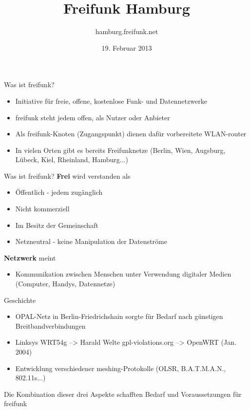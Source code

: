 \documentclass[c]{beamer}
\title{Freifunk Hamburg}
\author{hamburg.freifunk.net}
\date{19. Februar 2013}
\begin{document}
\maketitle

\begin{frame}{Was ist freifunk?}
	\begin{itemize}
		\item Initiative für freie, offene, kostenlose Funk- und Datennetzwerke
		\item freifunk steht jedem offen, als Nutzer oder Anbieter
		\item Als freifunk-Knoten (Zugangspunkt) dienen dafür vorbereitete WLAN-router
		\item In vielen Orten gibt es bereits Freifunknetze (Berlin, Wien, Augsburg, Lübeck, Kiel, Rheinland, Hamburg...)
	\end{itemize}
\end{frame}


\begin{frame}{Was ist freifunk?}
	\textbf{Frei} wird verstanden als
	\begin{itemize}
		\item Öffentlich - jedem zugänglich
		\item Nicht kommerziell
		\item Im Besitz der Gemeinschaft
		\item Netzneutral - keine Manipulation der Datenströme
	\end{itemize}
	\textbf{Netzwerk} meint
	\begin{itemize}
		\item Kommunikation zwischen Menschen unter Verwendung digitaler Medien (Computer, Handys, Datennetze)
	\end{itemize}
\end{frame}


\begin{frame}{Geschichte}
	\begin{itemize}
		\item OPAL-Netz in Berlin-Friedrichshain sorgte für Bedarf nach günstigen Breitbandverbindungen
		\item Linksys WRT54g --> Harald Welte gpl-violations.org --> OpenWRT (Jan. 2004)
		\item Entwicklung verschiedener meshing-Protokolle (OLSR, B.A.T.M.A.N., 802.11s...)
	\end{itemize}
	\begin{center}
		Die Kombination dieser drei Aspekte schafften Bedarf und Voraussetzungen für freifunk
	\end{center}
\end{frame}
\end{document}
